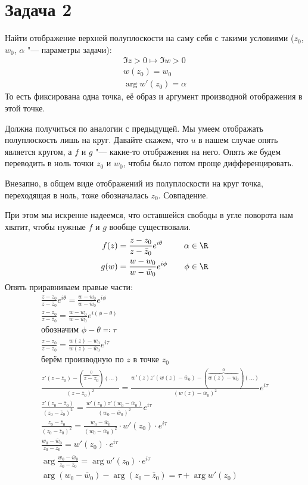 \section{Задача 2}
	Найти отображение верхней полуплоскости на саму себя с такими условиями ($z_0$, $w_0$, $\alpha$ "--- параметры задачи):
	\begin{gather*}
		\Im z > 0 \mapsto \Im w > 0 \\
		w(z_0) = w_0 \\
		\arg w'(z_0) = \alpha
	\end{gather*}
	То есть фиксирована одна точка, её образ и аргумент производной отображения в этой точке.

	Должна получиться по аналогии с предыдущей.
	Мы умеем отображать полуплоскость лишь на круг.
	Давайте скажем, что $u$ в нашем случае опять является кругом, а $f$ и $g$ "--- какие-то отображения на него.
	Опять же будем переводить в ноль точки $z_0$ и $w_0$, чтобы было потом проще дифференцировать.
	\begin{Rem}
		Внезапно, в общем виде отображений из полуплоскости на круг точка, переходящая в ноль, тоже обозначалась $z_0$.
		Совпадение.
	\end{Rem}
	При этом мы искренне надеемся, что оставшейся свободы в угле поворота нам хватит, чтобы нужные $f$ и $g$ вообще существовали.
	\begin{alignat*}{2}
		f(z) &= \frac{z-z_0}{z-\bar z_0} e^{i\theta} &\quad \alpha \in \R& \\
		g(w) &= \frac{w-w_0}{w-\bar w_0} e^{i\phi} &\quad \phi \in \R&
	\end{alignat*}
	Опять приравниваем правые части:
	\begin{gather*}
		\frac{z-z_0}{z-\bar z_0} e^{i\theta} = \frac{w-w_0}{w-\bar w_0} e^{i\phi} \\
		\frac{z-z_0}{z-\bar z_0} = \frac{w-w_0}{w-\bar w_0} e^{i(\phi-\theta)} \\
		\text{обозначим $\phi-\theta\eqcolon\tau$} \\
		\frac{z-z_0}{z-\bar z_0} = \frac{w(z)-w_0}{w(z)-\bar w_0} e^{i\tau} \\
		\text{берём производную по $z$ в точке $z_0$} \\
		\frac{z'(z-\bar z_0) - (\overbrace{z-z_0}^0)(\dots)}{(z-\bar z_0)^2} = \frac{w'(z)z'(w(z)-\bar w_0) - (\overbrace{w(z)-w_0}^0)(\dots)}{(w(z)-\bar w_0)^2} e^{i\tau} \\
		\frac{z'(z_0-\bar z_0)}{(z_0-\bar z_0)^2} = \frac{w'(z_0)z'(w_0-\bar w_0)}{(w_0-\bar w_0)^2} e^{i\tau} \\
		\frac{z_0-\bar z_0}{(z_0-\bar z_0)^2} = \frac{w_0-\bar w_0}{(w_0-\bar w_0)^2} \cdot w'(z_0) \cdot e^{i\tau} \\
		\frac{w_0-\bar w_0}{z_0-\bar z_0} = w'(z_0) \cdot e^{i\tau} \\
		\arg \frac{w_0-\bar w_0}{z_0-\bar z_0} = \arg w'(z_0) \cdot e^{i\tau} \\
		\arg (w_0-\bar w_0) - \arg (z_0-\bar z_0) = \tau + \arg w'(z_0)
	\end{gather*}
